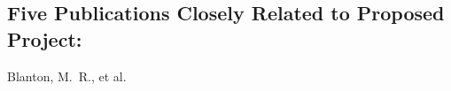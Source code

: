 \documentclass[12pt, preprint]{hacked-aastex}
\newenvironment{ditemize}
{ \begin{list}{}{%
\setlength{\topsep}{0pt}%
\setlength{\partopsep}{3pt}%
\setlength{\itemsep}{1pt}\setlength{\parsep}{1pt}%
\setlength{\itemindent}{0pt}\setlength{\listparindent}{12pt}%
\setlength{\leftmargin}{24pt}\setlength{\rightmargin}{0in}%
\setlength{\labelsep}{6pt}\setlength{\labelwidth}{6pt}%
\renewcommand{\makelabel}{\makebox[\labelwidth][l]{$\bullet$\hspace{\fill}}}}}
{\end{list}}
\begin{document}
\subsection*{\normalsize Five Publications Closely Related to Proposed Project:}
\begin{ditemize}\setlength{\itemsep}{0pt}
\item 
{Blanton}, M.~R., et al.~

\end{ditemize}
\end{document}
